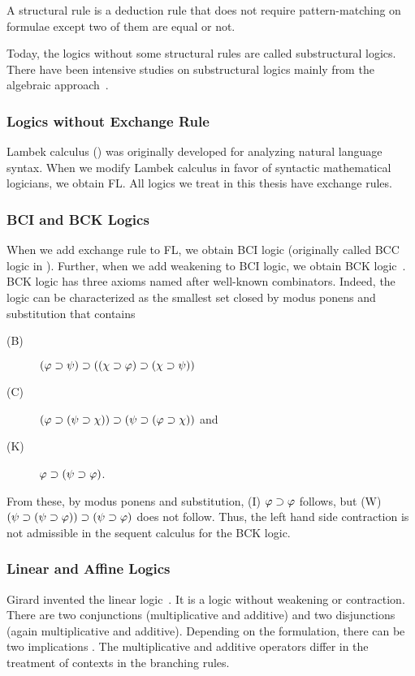 A structural rule
is a deduction rule that does not require
pattern-matching on formulae except two of them are equal or not.

Today, the logics without some structural rules are called substructural
logics.  There have been intensive studies on
substructural logics mainly from the algebraic
approach~\cite{residuated}.

\subsubsection{Logics without Exchange Rule}

Lambek calculus () was originally developed for
analyzing natural language syntax.  When we modify Lambek calculus in
favor of syntactic mathematical logicians, we obtain FL.
All logics we treat in this thesis have exchange rules.

\subsubsection{BCI and BCK Logics}

When we add exchange rule to FL, we obtain BCI logic (originally called
BCC logic in \citep{ono-komori-1985}).
Further, when we add weakening to BCI logic, we obtain BCK
logic~\citep{ono-komori-1985}.
BCK logic has three axioms named after well-known
combinators.  Indeed, the logic can be characterized as the smallest set
closed by modus ponens and substitution that contains
\begin{description}
 \item[(B)] $(\varphi\supset\psi)\supset((\chi\supset\varphi)\supset(\chi\supset\psi))$
 \item[(C)] $(\varphi\supset(\psi\supset\chi))\supset(\psi\supset(\varphi\supset\chi))$ and
 \item[(K)] $\varphi\supset(\psi\supset\varphi)$\enspace.
\end{description}
From these, by modus ponens and substitution, (I) $\varphi\supset\varphi$
follows, but
(W) $(\psi\supset(\psi\supset\varphi))\supset(\psi\supset\varphi)$ does not follow.
Thus, the left hand side contraction is not admissible in the sequent
calculus for the BCK logic.

\subsubsection{Linear and Affine Logics}

Girard invented the linear logic~\citep{girard1987}.  It is a logic
without weakening or contraction.  There are two conjunctions
(multiplicative and additive) and two
disjunctions (again multiplicative and additive).
Depending on the formulation, there can be two
implications .
The multiplicative and additive operators differ in
the treatment of contexts in the branching rules.

